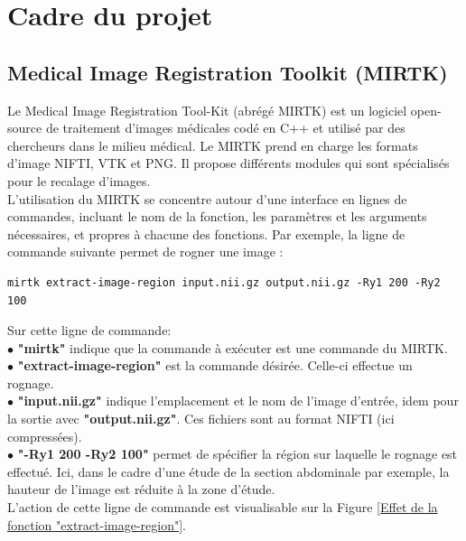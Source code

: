 \documentclass[10pt]{report}
\begin{document}
	\section{Cadre du projet} 
	\subsection{Medical Image Registration Toolkit (MIRTK)}
	Le Medical Image Registration Tool-Kit (abrégé MIRTK) est un logiciel open-source de traitement d'images médicales codé en C++ et utilisé par des chercheurs dans le milieu médical. Le MIRTK prend en charge les formats d'image NIFTI, VTK et PNG. Il propose différents modules qui sont spécialisés pour le recalage d'images. \\ 
	L'utilisation du MIRTK se concentre autour d'une interface en lignes de commandes, incluant le nom de la fonction, les paramètres et les arguments nécessaires, et propres à chacune des fonctions. Par exemple, la ligne de commande suivante permet de rogner une image :
	
	\begin{lstlisting}
mirtk extract-image-region input.nii.gz output.nii.gz -Ry1 200 -Ry2 100
	\end{lstlisting}
	
	\noindent Sur cette ligne de commande:\\
	\t{$\bullet$} \textbf{"mirtk"} indique que la commande à exécuter est une commande du MIRTK.\\
	\t{$\bullet$} \textbf{"extract-image-region"} est la commande désirée. Celle-ci effectue un rognage.\\
	\t{$\bullet$} \textbf{"input.nii.gz"} indique l'emplacement et le nom de l'image d'entrée, idem pour la sortie avec \textbf{"output.nii.gz"}. Ces fichiers sont au format NIFTI (ici compressées).\\
	\t{$\bullet$} \textbf{"-Ry1 200 -Ry2 100"} permet de spécifier la région sur laquelle le rognage est effectué. Ici, dans le cadre d'une étude de la section abdominale par exemple, la hauteur de l'image est réduite à la zone d'étude. 
	\\L'action de cette ligne de commande est visualisable sur la Figure \ref{Effet de la fonction "extract-image-region"}.
	
\end{document}
